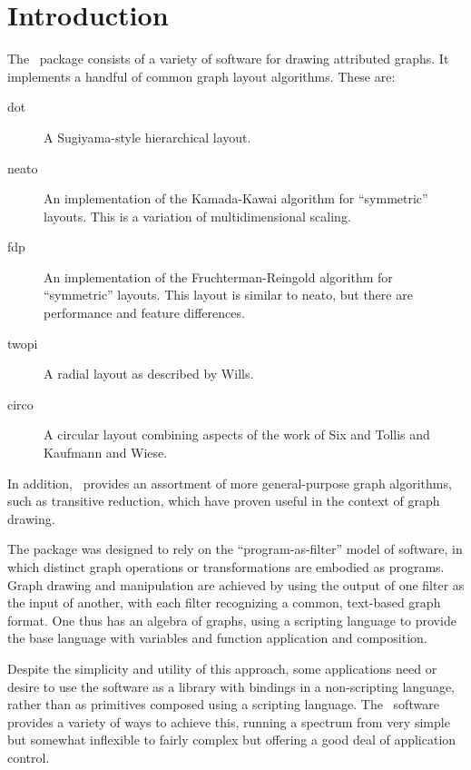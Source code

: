\section{Introduction}
The \gviz\ package consists of a variety of software for drawing
attributed graphs. It implements a handful of common graph layout
algorithms. These are: 
\begin{description}
 \item[dot] A Sugiyama-style hierarchical layout\cite{stt,gknv:methods}.
 \item[neato] An implementation of the Kamada-Kawai algorithm\cite{kk}
for ``symmetric'' layouts. This is a
variation of multidimensional scaling\cite{kruskal,cohen}.
 \item[fdp] An implementation of the Fruchterman-Reingold 
algorithm\cite{fr}
for ``symmetric'' layouts. This layout is similar to neato, but there
are performance and feature differences. 
 \item[twopi] A radial layout as described by Wills\cite{nicheworks}.
 \item[circo] A circular layout combining aspects of the
work of Six and Tollis\cite{st,st2} and Kaufmann and Wiese\cite{kw}.
\end{description}
In addition, \gviz\ provides an assortment of more general-purpose
graph algorithms, such as transitive reduction, which have proven useful in
the context of graph drawing.

The package was designed\cite{gviz}
 to rely on the
``program-as-filter'' model of software, in which distinct graph
operations or transformations are embodied as programs. Graph drawing
and manipulation are achieved by using the output of one filter as
the input of another, with each filter recognizing a common, text-based
graph format.
One thus has an algebra of graphs, using a scripting language to provide
the base language with variables and function application and composition.

Despite the simplicity and utility of this approach, some
applications need or desire to use the software as a library with
bindings in a non-scripting language, rather than as primitives composed
using a scripting language. The \gviz\ software provides a variety of 
ways to achieve
this, running a spectrum from very simple but somewhat inflexible to
fairly complex but offering a good deal of application control.

